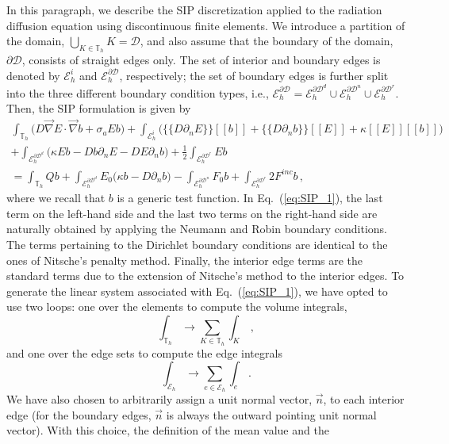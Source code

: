 \documentclass[preprint,10pt]{elsarticle}
\newcommand{\grad}{\vec{\nabla}}
\newcommand{\jmp}[1]{[\![#1]\!]}                     %
\newcommand{\mvl}[1]{\{\!\!\{#1\}\!\!\}}             %
\newcommand{\D}{\mathcal{D}}
\newcommand{\vn}{\vec{n}}
\newcommand{\EI}{\mathcal{E}_h^i}
\newcommand{\ED}{\mathcal{E}_h^{\partial \D^d}}
\newcommand{\EN}{\mathcal{E}_h^{\partial \D^n}}
\newcommand{\ER}{\mathcal{E}_h^{\partial \D^r}}
\newcommand{\eqt}[1]{Eq.~(\ref{#1})}                     %
\newcommand{\tf}{b}
\begin{document}
In this paragraph, we describe the SIP discretization \cite{DouglasN.Arnold2002,Kanschat2007} applied to the 
radiation diffusion equation using discontinuous finite elements. 
We introduce a partition
of the domain, $\bigcup\nolimits_{K\in \mathbb{T}_{h}}K=\D$, and also assume
that the boundary of the domain, $\partial \D$, consists of straight edges only. The 
set of interior and boundary edges is denoted by $\EI$ and $\mathcal{E}_h^{\partial\D}$,
respectively; the set of boundary edges is further split into the three different boundary 
condition types, i.e., $\mathcal{E}_h^{\partial\D} = \ED \cup \EN \cup \ER$. 
Then, the SIP formulation is given by
\begin{multline}
\label{eq:SIP_1}
\int_{\mathbb{T}_{h}} \Big( D \grad E \cdot \grad \tf + \sigma_a E \tf \Big)
+ \int_{\EI} \Big( \mvl{D\partial_n E} \jmp{\tf}  + \mvl{D\partial_n \tf} \jmp{E} + \kappa\jmp{E}\jmp{\tf} \Big)
\\
+ \int_{\ED} \Big( \kappa E \tf -D\tf \partial_n E  -D E \partial_n \tf \Big)
+ \frac{1}{2} \int_{\ER}  E \tf  
\\
=
\int_{\mathbb{T}_{h}} Q \tf 
+ \int_{\ED} E_0 \Big( \kappa \tf  -D \partial_n \tf  \Big)
- \int_{\EN} F_0 \tf  
+ \int_{\ER} 2 F^{inc} \tf  \, ,
\end{multline}
where we recall that $\tf$ is a generic test function. 
In \eqt{eq:SIP_1}, the last term on the left-hand side and the last two terms on the right-hand side 
are naturally obtained by applying the Neumann and Robin boundary conditions. The terms pertaining 
to the Dirichlet boundary conditions are identical to the ones of Nitsche's penalty method. 
Finally, the interior edge terms are the standard terms due to the extension of Nitsche's method to 
the interior edges.
To generate the linear system associated with \eqt{eq:SIP_1}, 
we have opted to use two loops: one over the elements to compute the volume integrals,
\begin{equation}
\int_{\mathbb{T}_{h}} \longrightarrow \sum_{K \in \mathbb{T}_{h}} \int_{K} \, ,
\end{equation}
and one over the edge sets to compute the edge integrals
\begin{equation}
\int_{\mathcal{E}_h} \longrightarrow \sum_{e \in \mathcal{E}_h} \int_{e} \, .
\end{equation}
We have also chosen to arbitrarily assign a unit normal vector, $\vn$, to each interior edge (for the boundary edges,
$\vn$ is always the outward pointing unit normal vector). With this choice, the definition of the mean value and the 
\end{document}
